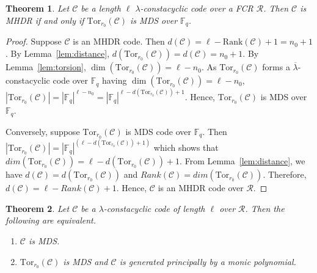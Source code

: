\documentclass[12pt,a4paper]{article}
\newtheorem{theorem}{Theorem}[section]
\begin{document}
\begin{theorem}\label{thm:mhdr}
    Let $\mathcal{C}$ be a length $\ell$ $\lambda$-constacyclic code over a FCR $\mathcal{R}$. Then $\mathcal{C}$ is MHDR if and only if $\mathrm{Tor}_{r_0}(\mathcal{C})$ is MDS over $\mathbb{F}_q$.
\end{theorem}
\begin{proof}
    Suppose $\mathcal{C}$ is an MHDR code. Then $d(\mathcal{C}) = \ell - \mathrm{Rank}(\mathcal{C}) + 1 = n_0 + 1$. By Lemma~\ref{lem:distance}, $d(\mathrm{Tor}_{r_0}(\mathcal{C})) = d(\mathcal{C}) = n_0 + 1$. By Lemma~\ref{lem:torsion}, $\dim(\mathrm{Tor}_{r_0}(\mathcal{C})) = \ell - n_0$. As $\mathrm{Tor}_{r_0}(\mathcal{C})$ forms a $\overline{\lambda}$-constacyclic code over $\mathbb{F}_q$ having $\dim(\mathrm{Tor}_{r_0}(\mathcal{C})) = \ell - n_0$, $|\mathrm{Tor}_{r_0}(\mathcal{C})| = |\mathbb{F}_q|^{\ell - n_0} = |\mathbb{F}_q|^{\ell - d(\mathrm{Tor}_{r_0}(\mathcal{C})) + 1}$. Hence, $\mathrm{Tor}_{r_0}(\mathcal{C})$ is MDS over $\mathbb{F}_q$.

    Conversely, suppose $\mathrm{Tor}_{r_0}(\mathcal{C})$ is MDS code over $\mathbb{F}_q$. Then $|\mathrm{Tor}_{r_0}(\mathcal{C})|=|\mathbb{F}_q|^{(\ell-d(\mathrm{Tor}_{r_0}(\mathcal{C}))+1)}$ which shows that $dim(\mathrm{Tor}_{r_0}(\mathcal{C}))=\ell-d(\mathrm{Tor}_{r_0}(\mathcal{C}))+1$. From Lemma~\ref{lem:distance}, we have  $d(\mathcal{C})=d(\mathrm{Tor}_{r_0}(\mathcal{C}))$ and $Rank(\mathcal{C})=dim(\mathrm{Tor}_{r_0}(\mathcal{C}))$. Therefore, $d(\mathcal{C})=\ell-Rank(\mathcal{C})+1$. Hence, $\mathcal{C}$ is an MHDR code over $\mathcal{R}$.
\end{proof}

\begin{theorem}\label{thm:principal}
    Let $\mathcal{C}$ be a $\lambda$-constacyclic code of length $\ell$ over $\mathcal{R}$. Then the following are equivalent.
    \begin{enumerate}
        \item[(i)] $\mathcal{C}$ is MDS.
        \item[(ii)] $\mathrm{Tor}_{r_0}(\mathcal{C})$ is MDS and $\mathcal{C}$ is generated principally by a monic polynomial.
    \end{enumerate}
\end{theorem}
\end{document}
